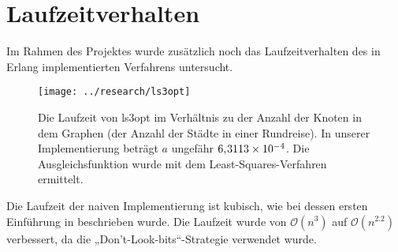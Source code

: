 \section{Laufzeitverhalten}
Im Rahmen des Projektes wurde zusätzlich noch das Laufzeitverhalten des
in Erlang implementierten Verfahrens untersucht. 
\begin{figure}[H]
  \centering
  \texttt{[image: ../research/ls3opt]}
  \caption[Laufzeit von ls3opt im Verhältnis zu der Anzahl der
  Knoten]{\label{fig:ls3optcomplxty} Die Laufzeit von ls3opt im
    Verhältnis zu der Anzahl der Knoten in dem Graphen (der Anzahl der
    Städte in einer Rundreise).   In unserer Implementierung beträgt $a$ ungefähr
    $6,\kern-1pt 3113 \times 10^{-4}$. Die Ausgleichsfunktion wurde mit
    dem Least-Squares-Verfahren ermittelt.} %
\end{figure}
\noindent
Die Laufzeit der naiven Implementierung ist kubisch, wie bei
dessen ersten Einführung in \cite{lin1965computer} beschrieben
wurde. Die Laufzeit wurde von $\mathcal{O}(n^3)$ auf
$\mathcal{O}(n^{2.2})$ verbessert, da die „Don't-Look-bits“-Strategie
verwendet wurde.
